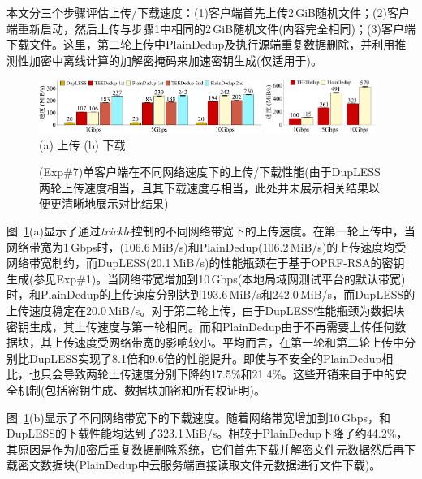 本文分三个步骤评估上传/下载速度：(1)客户端首先上传2\,GiB随机文件；(2)客户端重新启动，然后上传与步骤1中相同的2\,GiB随机文件(内容完全相同)；(3)客户端下载文件。这里，第二轮上传中PlainDedup及\sysnameS 执行源端重复数据删除，并利用推测性加密中离线计算的加解密掩码来加速密钥生成(仅适用于\sysnameS)。

\begin{figure}[!htb]
  \centering
  \includegraphics[width=0.646\textwidth]{pic/sgxdedup/plot/exp_b1/upload_network_speed_bar.pdf}
  \includegraphics[width=0.324\textwidth]{pic/sgxdedup/plot/exp_b1/download_network_speed_bar.pdf}
  \\
  \hspace{1.1in} {\small (a) 上传} \hspace{1.9in}
  {\small (b) 下载}\\
  \caption{(Exp\#7)单客户端在不同网络速度下的上传/下载性能(由于DupLESS两轮上传速度相当，且其下载速度与\sysnameS 相当，此处并未展示相关结果以便更清晰地展示对比结果)}
  \label{fig:sgxdedup-singleClientThroughput}
\end{figure}

图~\ref{fig:sgxdedup-singleClientThroughput}(a)显示了通过\textit{trickle}控制的不同网络带宽下的上传速度。在第一轮上传中，当网络带宽为1\,Gbps时，\sysnameS (106.6\,MiB/s)和PlainDedup(106.2\,MiB/s)的上传速度均受网络带宽制约，而DupLESS(20.1\,MiB/s)的性能瓶颈在于基于OPRF-RSA的密钥生成(参见Exp\#1)。当网络带宽增加到10\,Gbps(本地局域网测试平台的默认带宽)时，\sysnameS 和PlainDedup的上传速度分别达到193.6\,MiB/s和242.0\,MiB/s，而DupLESS的上传速度稳定在20.0\,MiB/s。对于第二轮上传，由于DupLESS性能瓶颈为数据块密钥生成，其上传速度与第一轮相同。而\sysnameS 和PlainDedup由于不再需要上传任何数据块，其上传速度受网络带宽的影响较小。平均而言，\sysnameS 在第一轮和第二轮上传中分别比DupLESS实现了8.1倍和9.6倍的性能提升。即使与不安全的PlainDedup相比，\sysnameS 也只会导致两轮上传速度分别下降约17.5\%和21.4\%。这些开销来自于\sysnameS 中的安全机制(包括密钥生成、数据块加密和所有权证明)。

图~\ref{fig:sgxdedup-singleClientThroughput}(b)显示了不同网络带宽下的下载速度。随着网络带宽增加到10\,Gbps，\sysnameS 和DupLESS的下载性能均达到了323.1\,MiB/s。相较于PlainDedup下降了约44.2\%，其原因是作为加密后重复数据删除系统，它们首先下载并解密文件元数据然后再下载密文数据块(PlainDedup中云服务端直接读取文件元数据进行文件下载)。

